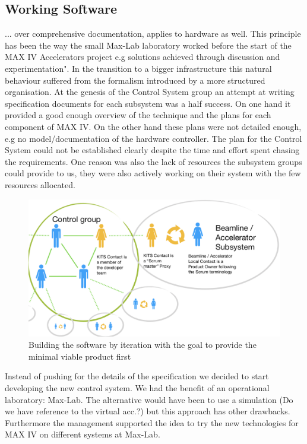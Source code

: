 \documentclass[a4paper,
              ]{jacow}
\begin{document}
\subsection{Working Software}
... over comprehensive documentation, applies to hardware as well.
This principle has been the way the small Max-Lab laboratory worked before the start of the MAX IV Accelerators project e.g solutions achieved through discussion and experimentation". In the transition to a bigger infrastructure this natural behaviour suffered from the formalism introduced by a more structured organisation.
At the genesis of the Control System group an attempt at writing specification documents for each subsystem was a half success. On one hand it provided a good enough overview of the technique and the plans for each component of MAX IV. On the other hand these plans were not detailed enough, e.g no model/documentation of the hardware controller. The plan for the Control System could not be established clearly despite the time and effort spent chasing the requirements. One reason was also the lack of resources the subsystem groups could provide to us, they were also actively working on their system with the few resources allocated.

\begin{figure}[!tbh]
    \centering
    \includegraphics*[scale=0.5]{WEMPL008f2}

    \caption{Building the software by iteration with the goal to provide the minimal viable product first}
    \label{WEMPL008f2}
\end{figure}

Instead of pushing for the details of the specification we decided to start developing the new control system. We had the benefit of an operational laboratory: Max-Lab. The alternative would have been to use a simulation (Do we have reference to the virtual acc.?) but this approach has other drawbacks. Furthermore the management supported the idea to try the new technologies for MAX IV on different systems at Max-Lab.
\end{document}
